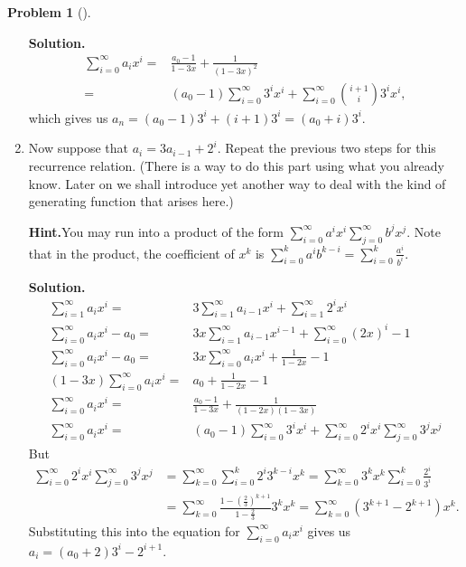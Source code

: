 \documentclass[10pt,]{book}
\theoremstyle{plain}
\theoremstyle{definition}
\newtheorem{activity}[project]{Problem}
\theoremstyle{definition}
\numberwithin{equation}{chapter}
\newcommand{\amp}{&}
\begin{document}
\begin{activity}[]
\begin{enumerate}[font=\bfseries,label=(\alph*),ref=\alph*]
\textbf{Solution.}\quad %
\begin{align*}
\sum_{i=0}^\infty a_i x^i  =\amp \frac{a_0-1}{1-3x} + \frac{1}{(1-3x)^2}\\
=\amp (a_0-1)\sum_{i=0}^\infty 3^ix^i +\sum_{i=0}^\infty \binom{i+1}{i}3^ix^i,
\end{align*}
which gives us \(a_n=(a_0-1) 3^i + (i+1)3^i=(a_0+i)3^i\).%
\item\label{task-155} Now suppose that \(a_i=3a_{i-1} + 2^i\).  Repeat the previous two steps for this recurrence relation.  (There is a way to do this part using what you already know.  Later on we shall introduce yet another way to deal with the kind of generating function that arises here.)%
\par\medskip\noindent%
\textbf{Hint.}\quad You may run into a product of the form \(\sum_{i=0}^\infty a^ix^i\sum_{j=0}^\infty b^jx^j\). Note that in the product, the coefficient of \(x^k\) is \(\sum_{i=0}^k a^ib^{k-i} = \sum_{i=0}^k \frac{a^i}{b^i}\).%
\par\medskip\noindent%
\textbf{Solution.}\quad %
\begin{align*}
\sum_{i=1}^\infty a_ix^i =\amp 3\sum_{i=1}^\infty
a_{i-1}x^i +\sum_{i=1}^\infty 2^ix^i\\
\sum_{i=0}^\infty a_ix^i -a_0  =\amp 3x\sum_{i=1}^\infty a_{i-1}x^{i-1}
+\sum_{i=0}^\infty (2x)^i -1\\
\sum_{i=0}^\infty a_ix^i -a_0  =\amp 3x\sum_{i=0}^\infty a_ix^i +\frac{1}{1-2x} -1\\
(1-3x)\sum_{i=0}^\infty a_ix^i =\amp a_0 +\frac{1}{1-2x}-1\\
\sum_{i=0}^\infty a_ix^i =\amp  \frac{a_0-1}{1-3x}+\frac{1}{(1-2x)(1-3x)}\\
\sum_{i=0}^\infty a_ix^i =\amp (a_0-1)\sum_{i=0}^\infty 3^ix^i +\sum_{i=0}^\infty
2^ix^i\sum_{j=0}^\infty 3^jx^j
\end{align*}
But%
\begin{align*}
\sum_{i=0}^\infty
2^ix^i\sum_{j=0}^\infty 3^jx^j\amp=
\sum_{k=0}^\infty
\sum_{i=0}^k 2^i3^{k-i}x^k=
\sum_{k=0}^\infty3^kx^k
\sum_{i=0}^k \frac{2^i}{3^i}
\\
\amp=\sum_{k=0}^\infty \frac{1-\left(\frac{2}{3}\right)^{k+1}}{1-\frac{2}{3}}3^kx^k =\sum_{k=0}^\infty
(3^{k+1}-2^{k+1})x^k
\text{.}
\end{align*}
Substituting this into the equation for \(\sum_{i=0}^\infty a_ix^i\) gives us \(a_i =(a_0+2)3^i -2^{i+1}\).%
\end{enumerate}
\end{activity}
\end{document}
